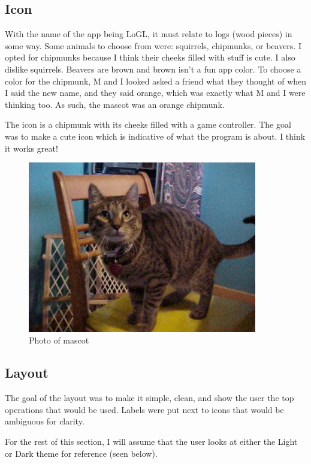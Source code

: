 \subsection{Icon}

With the name of the app being LoGL, it must relate to logs (wood
pieces) in some way.
Some animals to choose from were: squirrels, chipmunks, or beavers. I
opted for chipmunks because I think their cheeks filled with stuff is
cute. I also dislike squirrels. Beavers are brown and brown
isn't a fun app color. To choose a color for the chipmunk, M and I
looked asked a friend what they thought of when I said the new name,
and they said orange, which was exactly what M and I were thinking too.
As such, the mascot was an orange chipmunk.

The icon is a chipmunk with its cheeks filled with a game controller.
The goal was to make a cute icon which is indicative of what the
program is about. I think it works great!

\begin{figure}[htb]
	\centering
	\includegraphics[width=10cm]{./Images/cats_00001.jpg}
	\caption{Photo of mascot}
	\label{fig:AppLD}
\end{figure}

\subsection{Layout}

The goal of the layout was to make it simple, clean, and show the
user the top operations that would be used.
Labels were put next to icons that would be ambiguous for clarity.

For the rest of this section, I will assume that the user looks at
either the Light or Dark theme for reference (seen below).

